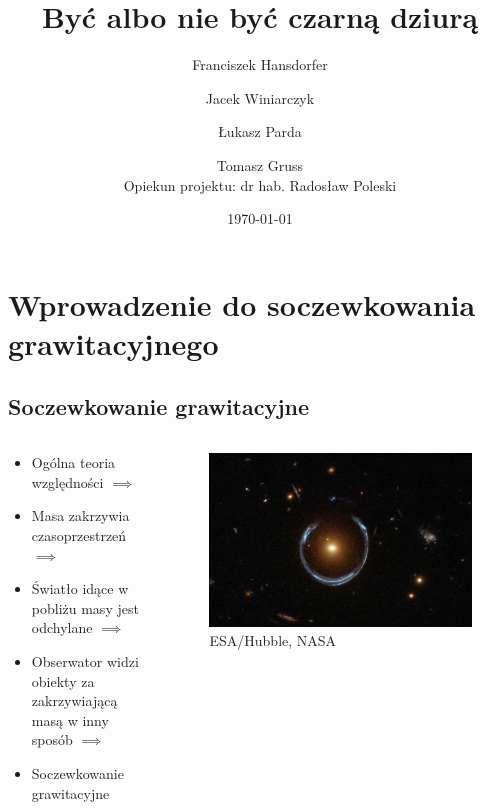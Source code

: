 \documentclass{beamer}
\title{Być albo nie być czarną dziurą}
\author[F. Hansdorfer \and J. Winiarczyk \and Ł. Parda
\and T. Gruss]{Franciszek Hansdorfer \and Jacek Winiarczyk \and Łukasz Parda
\and Tomasz Gruss\\{\small Opiekun projektu: dr hab. Radosław Poleski}}
\date{\today}
\begin{document}
\begin{frame}
    \titlepage
\end{frame}

\section{Wprowadzenie do soczewkowania grawitacyjnego}
\subsection{Soczewkowanie grawitacyjne}

\begin{frame}
    \begin{columns}
        \begin{column}{0.5\linewidth}
            \begin{itemize}
                \item Ogólna teoria względności $\implies$
                \item Masa zakrzywia czasoprzestrzeń $\implies$
                \item Światło idące w pobliżu masy jest odchylane $\implies$
                \item Obserwator widzi obiekty za zakrzywiającą masą w inny sposób $\implies$
                \item Soczewkowanie grawitacyjne
            \end{itemize}
        \end{column}
        \begin{column}{0.5\linewidth}
            \begin{figure}
                \includegraphics[width=\textwidth]{A_Horseshoe_Einstein_Ring_from_Hubble.jpeg}
                \caption*{\tiny{ESA/Hubble, NASA}}
            \end{figure}
        \end{column}
    \end{columns}
\end{frame}
\end{document}
